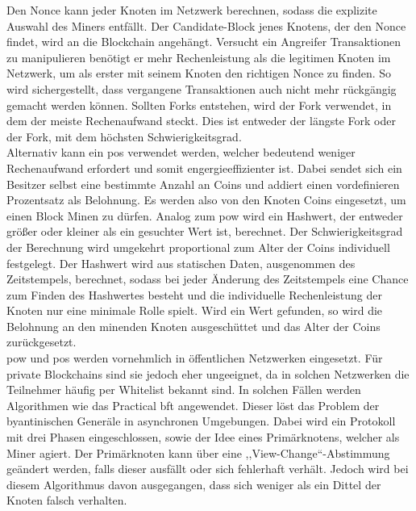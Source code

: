         Den Nonce kann jeder Knoten im Netzwerk berechnen, sodass die explizite Auswahl des Miners entfällt. 
        Der Candidate-Block jenes Knotens, der den Nonce findet, wird an die Blockchain angehängt. 
        Versucht ein Angreifer Transaktionen zu manipulieren benötigt er mehr Rechenleistung als die legitimen Knoten im Netzwerk, um als erster mit seinem Knoten den richtigen Nonce zu finden. 
        So wird sichergestellt, dass vergangene Transaktionen auch nicht mehr rückgängig gemacht werden können.
        Sollten Forks entstehen, wird der Fork verwendet, in dem der meiste Rechenaufwand steckt.
        Dies ist entweder der längste Fork oder der Fork, mit dem höchsten Schwierigkeitsgrad.\cite{Christidis2016,Nakamoto2008}
        \medskip\\
        Alternativ kann ein \gls{pos} verwendet werden, welcher bedeutend weniger Rechenaufwand erfordert und somit engergieeffizienter ist. 
        Dabei sendet sich ein Besitzer selbst eine bestimmte Anzahl an Coins und addiert einen vordefinieren Prozentsatz als Belohnung. 
        Es werden also von den Knoten Coins eingesetzt, um einen Block Minen zu dürfen.
        Analog zum \gls{pow} wird ein Hashwert, der entweder größer oder kleiner als ein gesuchter Wert ist, berechnet.
        Der Schwierigkeitsgrad der Berechnung wird umgekehrt proportional zum Alter der Coins individuell festgelegt. 
        Der Hashwert wird aus statischen Daten, ausgenommen des Zeitstempels, berechnet, sodass bei jeder Änderung des Zeitstempels eine Chance zum Finden des Hashwertes besteht und die individuelle Rechenleistung der Knoten nur eine minimale Rolle spielt. 
        Wird ein Wert gefunden, so wird die Belohnung an den minenden Knoten ausgeschüttet und das Alter der Coins zurückgesetzt.\cite{Tschorsch2016}
        \medskip\\
        \gls{pow} und \gls{pos} werden vornehmlich in öffentlichen Netzwerken eingesetzt.
        Für private Blockchains sind sie jedoch eher ungeeignet, da in solchen Netzwerken die Teilnehmer häufig per Whitelist bekannt sind. 
        In solchen Fällen werden Algorithmen wie das Practical \gls{bft} angewendet. 
        Dieser löst das Problem der byantinischen Generäle\cite{Vukolic2016} in asynchronen Umgebungen.
        Dabei wird ein Protokoll mit drei Phasen eingeschlossen, sowie der Idee eines Primärknotens, welcher als Miner agiert. 
        Der Primärknoten kann über eine ,,View-Change``-Abstimmung geändert werden, falls dieser ausfällt oder sich fehlerhaft verhält.
        Jedoch wird bei diesem Algorithmus davon ausgegangen, dass sich weniger als ein Dittel der Knoten falsch verhalten.\cite{Christidis2016}
    
